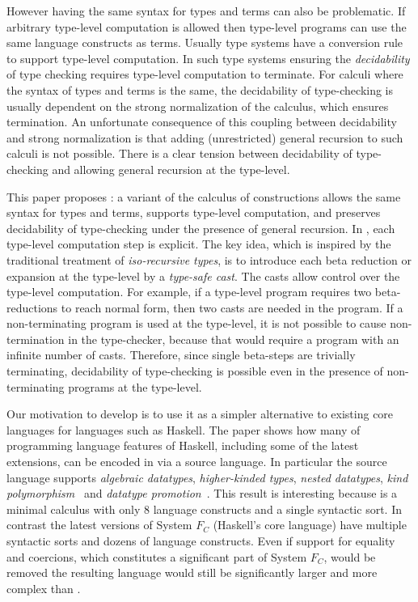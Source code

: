 However having the same syntax for types and terms can also 
be problematic. If arbitrary type-level computation is allowed 
then type-level programs can use the same language constructs 
as terms. Usually type systems have a conversion rule to support type-level
computation. In such type systems ensuring the \emph{decidability} of
type checking requires type-level computation to terminate.  For
calculi where the syntax of types and terms is the same, the
decidability of type-checking is usually dependent on the strong
normalization of the calculus, which ensures termination. An
unfortunate consequence of this coupling between decidability and
strong normalization is that adding (unrestricted) general recursion
to such calculi is not possible. There is a clear tension 
between decidability of type-checking and allowing general recursion 
at the type-level.


This paper proposes \name: a variant of the calculus of constructions
allows the same syntax for types and terms, supports type-level
computation, and preserves decidability of type-checking under the
presence of general recursion. In \name, each type-level computation
step is explicit.    The key idea, which is inspired by the traditional
treatment of \emph{iso-recursive types}, is to introduce each beta
reduction or expansion at the type-level by a \emph{type-safe
  cast}. The
casts allow control over the type-level computation. For example, if
a type-level program requires two beta-reductions to reach normal
form, then two casts are needed in the program. If a non-terminating
program is used at the type-level, it is not possible to cause
non-termination in the type-checker, because that would require a
program with an infinite number of casts. Therefore, since single beta-steps are
trivially terminating, decidability of type-checking is possible even
in the presence of non-terminating programs at the type-level. 

Our motivation to develop \name is to use it as a simpler alternative
to existing core languages for languages such as Haskell. 
The paper shows how many of programming language features of
Haskell, including some of the latest extensions, can be encoded in
\name via a source language. In particular the source language
supports \emph{algebraic datatypes}, \emph{higher-kinded types},
\emph{nested datatypes}, \emph{kind polymorphism}~\cite{} and
\emph{datatype promotion}~\cite{}.  This result is interesting because
\name is a minimal calculus with only 8 language constructs and a
single syntactic sort. In contrast the latest versions of System
$F_{C}$ (Haskell's core language) have multiple syntactic sorts and
dozens of language constructs.  Even if support for equality and
coercions, which constitutes a significant part of System $F_{C}$,
would be removed the resulting language would still be significantly
larger and more complex than \name.

